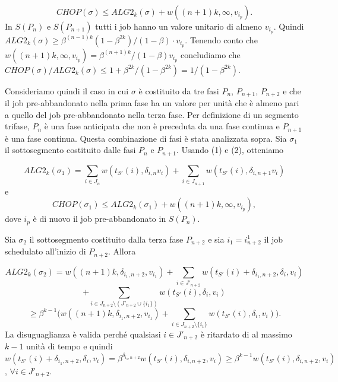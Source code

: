 \documentclass[12pt]{article}
\begin{document}
\begin{equation}
CHOP (\sigma) \leq ALG2_{k} (\sigma) + w((n + 1) k, \infty, v_{i_{p}}). \tag*{(2)}
\end{equation}
In $S(P_{n})$ e $S(P_{n+1})$ tutti i job hanno un valore unitario di almeno $v_{i_{p}}$. Quindi $ALG2_{k} (\sigma) \geq \beta^{(n - 1)k}(1 - \beta^{2k}) / (1 - \beta) \cdot v_{i_{p}}$. Tenendo conto che $w ((n +1) k, \infty, v_{i_{p}}) = \beta^{(n + 1) k} / (1 - \beta) v_{i_{p}}$ concludiamo che $CHOP(\sigma) / ALG2_{k}(\sigma) \leq 1 + \beta^{2k} / (1 - \beta^{2k}) = 1 / (1 - \beta^{2k})$.

Consideriamo quindi il caso in cui $\sigma$ è costituito da tre fasi $P_{n}$, $P_{n+1}$, $P_{n+2}$ e che il job pre-abbandonato nella prima fase ha un valore per unità che è almeno pari a quello del job pre-abbandonato nella terza fase. Per definizione di un segmento trifase, $P_{n}$ è una fase anticipata che non è preceduta da una fase continua e $P_{n+1}$ è una fase continua. Questa combinazione di fasi è stata analizzata sopra. Sia $\sigma_{1}$ il sottosegmento costituito dalle fasi $P_{n}$ e $P_{n+1}$. Usando (1) e (2), otteniamo

$$ALG2_{k} (\sigma_{1}) = \sum_{i \in J_{n}} w(t_{S'}(i), \delta_{i, n}v_{i}) + \sum_{i\in J_{n+1}} w (t_{S'}(i), \delta_{i, n + 1} v_{i})$$
e
\begin{equation}
CHOP (\sigma_{1}) \leq ALG2_{k} (\sigma_{1}) + w ((n + 1) k, \infty, v_{i_{p}}), \tag*{(3)}
\end{equation}
dove $i_{p}$ è di nuovo il job pre-abbandonato in $S (P_{n})$.

Sia $\sigma_{2}$ il sottosegmento costituito dalla terza fase $P_{n+2}$ e sia $i_{1} = i^{1}_{n+2}$ il job schedulato all'inizio di $P_{n+2}$. Allora

$$ALG2_{k} (\sigma_{2}) = w ((n + 1) k, \delta_{i_{1}, n + 2}, v_{i_{1}}) + \sum_{i \in J'_{n+2}} w(t_{S'}(i) + \delta_{i_{1}, n+2}, \delta_{i}, v_{i})$$
$$+ \sum_{i \in J_{n + 2} \setminus (J'_{n + 2} \cup \{i_{1}\})} w(t_{S'}(i), \delta_{i}, v_{i})$$
$$\geq \beta^{k - 1}\Bigg( w((n + 1) k, \delta_{i_{1},n+2}, v_{i_{1}}) + \sum_{i \in J_{n + 2} \setminus \{i_{1}\}} w(t_{S'}(i), \delta_{i}, v_{i}) \Bigg).$$
La disuguaglianza è valida perché qualsiasi $i \in J'_{n+2}$ è ritardato di al massimo $k - 1$
unità di tempo e quindi $w(t_{S'}(i) + \delta_{i_{1}, n + 2}, \delta_{i}, v_{i}) = \beta^{\delta_{i_{1}, n + 2}} w (t_{S'}(i), \delta_{i, n + 2}, v_{i}) \geq \beta^{k - 1}w (t_{S'}(i) , \delta_{i, n + 2}, v_{i})$, $\forall i \in J'_{n+2}$.
\end{document}
